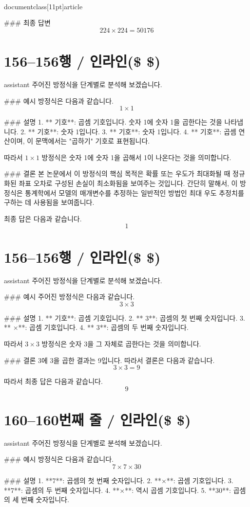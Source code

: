 \\documentclass[11pt]{article}
\begin{document}
### 최종 답변
\[
\boxed{224 \times 224 = 50176}
\]

\section*{156–156행 / 인라인(\$ \$) }
assistant
주어진 방정식을 단계별로 분석해 보겠습니다.

### 예시
방정식은 다음과 같습니다.
\[ 1 \times 1 \]

### 설명
1. ** 기호**: 곱셈 기호입니다. 숫자 1에 숫자 1을 곱한다는 것을 나타냅니다.
2. ** 기호**: 숫자 1입니다.
3. ** 기호**: 숫자 1입니다.
4. ** 기호**: 곱셈 연산이며, 이 문맥에서는 "곱하기" 기호로 표현됩니다.

따라서 \(1 \times 1\) 방정식은 숫자 1에 숫자 1을 곱해서 1이 나온다는 것을 의미합니다.

### 결론
본 논문에서 이 방정식의 핵심 목적은 확률 또는 우도가 최대화될 때 정규화된 좌표 오차로 구성된 손실이 최소화됨을 보여주는 것입니다. 간단히 말해서, 이 방정식은 통계학에서 모델의 매개변수를 추정하는 일반적인 방법인 최대 우도 추정치를 구하는 데 사용됨을 보여줍니다.

최종 답은 다음과 같습니다.
\[
\boxed{1}
\]

\section*{156–156행 / 인라인(\$ \$) }
assistant
주어진 방정식을 단계별로 분석해 보겠습니다.

### 예시
주어진 방정식은 다음과 같습니다.
\[ 3 \times 3 \]

### 설명
1. ** 기호**: 곱셈 기호입니다.
2. ** 3**: 곱셈의 첫 번째 숫자입니다.
3. ** ×**: 곱셈 기호입니다.
4. ** 3**: 곱셈의 두 번째 숫자입니다.

따라서 \( 3 \times 3 \) 방정식은 숫자 3을 그 자체로 곱한다는 것을 의미합니다.

### 결론
3에 3을 곱한 결과는 9입니다. 따라서 결론은 다음과 같습니다.
\[ 3 \times 3 = 9 \]

따라서 최종 답은 다음과 같습니다.
\[
\boxed{9}
\]

\section*{160–160번째 줄 / 인라인(\$ \$) }
assistant
주어진 방정식을 단계별로 분석해 보겠습니다.

### 예시
방정식은 다음과 같습니다.
\[ 7 \times 7 \times 30 \]

### 설명
1. **7**: 곱셈의 첫 번째 숫자입니다.
2. **×**: 곱셈 기호입니다.
3. **7**: 곱셈의 두 번째 숫자입니다.
4. **×**: 역시 곱셈 기호입니다.
5. **30**: 곱셈의 세 번째 숫자입니다.
\end{document}
